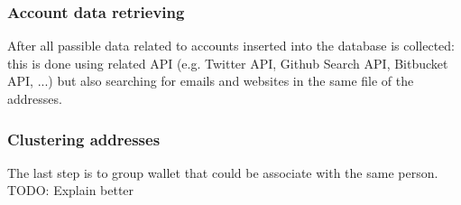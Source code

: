 \subsubsection*{Account data retrieving} After all passible data related to
accounts inserted into the database is collected: this is done using related API
(e.g. Twitter API, Github Search API, Bitbucket API, ...) but also searching for
emails and websites in the same file of the addresses.
\subsubsection*{Clustering addresses} The last step is to group wallet that
could be associate with the same person. TODO: Explain better